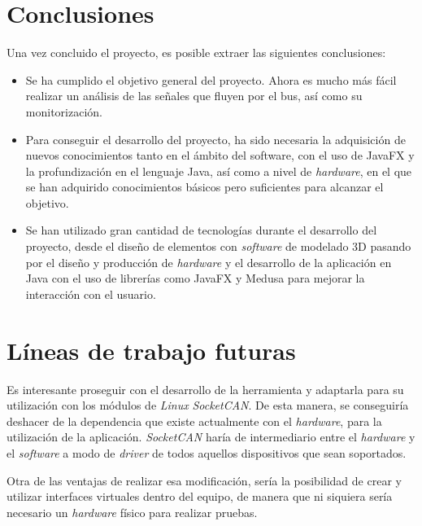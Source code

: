 
\section{Conclusiones}\label{conclusiones}

Una vez concluido el proyecto, es posible extraer las siguientes conclusiones:
\begin{itemize}
\item
Se ha cumplido el objetivo general del proyecto. Ahora es mucho más fácil realizar un análisis de las señales que fluyen por el bus, así como su monitorización.

\item
Para conseguir el desarrollo del proyecto, ha sido necesaria la adquisición de nuevos conocimientos tanto en el ámbito del software, con el uso de JavaFX y la profundización en el lenguaje Java, así como a nivel de \emph{hardware}, en el que se han adquirido conocimientos básicos pero suficientes para alcanzar el objetivo.

\item
Se han utilizado gran cantidad de tecnologías durante el desarrollo del proyecto, desde el diseño de elementos con \emph{software} de modelado 3D pasando por el diseño y producción de \emph{hardware} y el desarrollo de la aplicación en Java con el uso de librerías como JavaFX y Medusa para mejorar la interacción con el usuario.

\end{itemize}

\newpage
\section{Líneas de trabajo futuras}\label{lineas_de_trabajo_futuras}

Es interesante proseguir con el desarrollo de la herramienta y adaptarla para su utilización con los módulos de \emph{Linux} \emph{SocketCAN}.
De esta manera, se conseguiría deshacer de la dependencia que existe actualmente con el \emph{hardware}, para la utilización de la aplicación. \emph{SocketCAN} haría de intermediario entre el \emph{hardware} y el \emph{software} a modo de \emph{driver} de todos aquellos dispositivos que sean soportados.

Otra de las ventajas de realizar esa modificación, sería la posibilidad de crear y utilizar interfaces virtuales dentro del equipo, de manera que ni siquiera sería necesario un \emph{hardware} físico para realizar pruebas.
